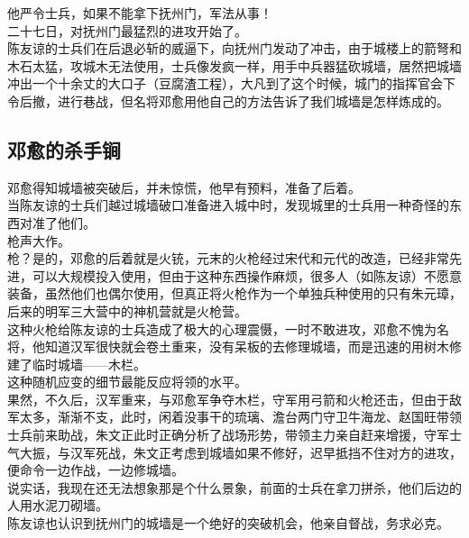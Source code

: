 \begin{multicols}{\theparacolNo}
他严令士兵，如果不能拿下抚州门，军法从事！\\

二十七日，对抚州门最猛烈的进攻开始了。\\

陈友谅的士兵们在后退必斩的威逼下，向抚州门发动了冲击，由于城楼上的箭弩和木石太猛，攻城木无法使用，士兵像发疯一样，用手中兵器猛砍城墙，居然把城墙冲出一个十余丈的大口子（豆腐渣工程），大凡到了这个时候，城门的指挥官会下令后撤，进行巷战，但名将邓愈用他自己的方法告诉了我们城墙是怎样炼成的。\\

\subsection{邓愈的杀手锏}
邓愈得知城墙被突破后，并未惊慌，他早有预料，准备了后着。\\

当陈友谅的士兵们越过城墙破口准备进入城中时，发现城里的士兵用一种奇怪的东西对准了他们。\\

枪声大作。\\

枪？是的，邓愈的后着就是火铳，元末的火枪经过宋代和元代的改造，已经非常先进，可以大规模投入使用，但由于这种东西操作麻烦，很多人（如陈友谅）不愿意装备，虽然他们也偶尔使用，但真正将火枪作为一个单独兵种使用的只有朱元璋，后来的明军三大营中的神机营就是火枪营。\\

这种火枪给陈友谅的士兵造成了极大的心理震慑，一时不敢进攻，邓愈不愧为名将，他知道汉军很快就会卷土重来，没有呆板的去修理城墙，而是迅速的用树木修建了临时城墙——木栏。\\

这种随机应变的细节最能反应将领的水平。\\

果然，不久后，汉军重来，与邓愈军争夺木栏，守军用弓箭和火枪还击，但由于敌军太多，渐渐不支，此时，闲着没事干的琉璃、澹台两门守卫牛海龙、赵国旺带领士兵前来助战，朱文正此时正确分析了战场形势，带领主力亲自赶来增援，守军士气大振，与汉军死战，朱文正考虑到城墙如果不修好，迟早抵挡不住对方的进攻，便命令一边作战，一边修城墙。\\

说实话，我现在还无法想象那是个什么景象，前面的士兵在拿刀拼杀，他们后边的人用水泥刀砌墙。\\

陈友谅也认识到抚州门的城墙是一个绝好的突破机会，他亲自督战，务求必克。\\


\end{multicols}
